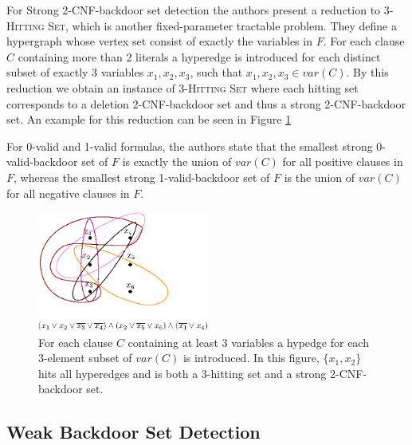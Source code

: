 \documentclass[11pt,a4paper]{article}
\theoremstyle{definition}
\theoremstyle{proposition}
\begin{document}
For Strong 2-CNF-backdoor set detection the authors present a reduction to \textsc{3-Hitting Set}, which is another fixed-parameter tractable problem. They define a hypergraph whose vertex set consist of exactly the variables in $F$. For each clause $C$ containing more than 2 literals a hyperedge is introduced for each distinct subset of exactly 3 variables $x_1,x_2,x_3$, such that $x_1,x_2,x_3 \in var(C)$. By this reduction we obtain an instance of \textsc{3-Hitting Set} where each hitting set corresponds to a deletion 2-CNF-backdoor set and thus a strong 2-CNF-backdoor set. An example for this reduction can be seen in Figure \ref{fig:2cnf-to-3hittingset}

For 0-valid and 1-valid formulas, the authors state that the smallest strong 0-valid-backdoor set of $F$ is exactly the union of $var(C)$ for all positive clauses in $F$, whereas the smallest strong 1-valid-backdoor set of $F$ is the union of $var(C)$ for all negative clauses in $F$. 

\begin{figure}[h]
        \centering
        \includegraphics[width=0.5\textwidth]{figures/hitting_set.eps}
	\caption{For each clause $C$ containing at least 3 variables a hypedge for each 3-element subset of $var(C)$ is introduced. In this figure, $\{x_1, x_2\}$ hits all hyperedges and is both a 3-hitting set and a strong 2-CNF-backdoor set.}
	\label{fig:2cnf-to-3hittingset}
\end{figure}


\subsection{Weak Backdoor Set Detection}
\end{document}
